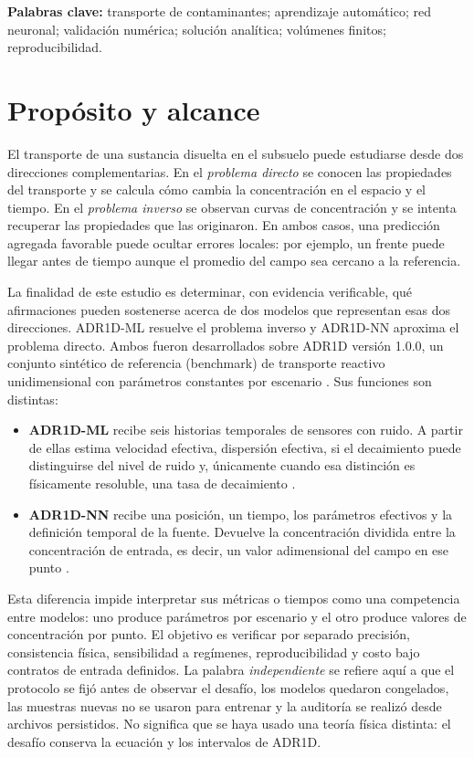 \documentclass[11pt,a4paper]{article}
\begin{document}
\textbf{Palabras clave:} transporte de contaminantes; aprendizaje automático;
red neuronal; validación numérica; solución analítica; volúmenes finitos;
reproducibilidad.

\newpage
\tableofcontents
\clearpage

\section{Propósito y alcance}

El transporte de una sustancia disuelta en el subsuelo puede estudiarse desde
dos direcciones complementarias. En el \emph{problema directo} se conocen las
propiedades del transporte y se calcula cómo cambia la concentración en el
espacio y el tiempo. En el \emph{problema inverso} se observan curvas de
concentración y se intenta recuperar las propiedades que las originaron. En
ambos casos, una predicción agregada favorable puede ocultar errores locales:
por ejemplo, un frente puede llegar antes de tiempo aunque el promedio del
campo sea cercano a la referencia.

La finalidad de este estudio es determinar, con evidencia verificable, qué
afirmaciones pueden sostenerse acerca de dos modelos que representan esas dos
direcciones. ADR1D-ML resuelve el problema inverso y ADR1D-NN aproxima el
problema directo. Ambos fueron desarrollados sobre ADR1D versión 1.0.0, un
conjunto sintético de referencia (benchmark) de transporte reactivo
unidimensional con parámetros
constantes por escenario \cite{adr1d}. Sus funciones son distintas:

\begin{itemize}
    \item \textbf{ADR1D-ML} recibe seis historias temporales de sensores con
    ruido. A partir de ellas estima velocidad efectiva, dispersión efectiva,
    si el decaimiento puede distinguirse del nivel de ruido y, únicamente
    cuando esa distinción es físicamente resoluble, una tasa de decaimiento
    \cite{adr1dml}.
    \item \textbf{ADR1D-NN} recibe una posición, un tiempo, los parámetros
    efectivos y la definición temporal de la fuente. Devuelve la concentración
    dividida entre la concentración de entrada, es decir, un valor adimensional
    del campo en ese punto \cite{adr1dnn}.
\end{itemize}

Esta diferencia impide interpretar sus métricas o tiempos como una competencia
entre modelos: uno produce parámetros por escenario y el otro produce valores
de concentración por punto. El objetivo es verificar por separado precisión,
consistencia física, sensibilidad a regímenes, reproducibilidad y costo bajo
contratos de entrada definidos. La palabra \emph{independiente} se refiere aquí
a que el protocolo se fijó antes de observar el desafío, los modelos quedaron
congelados, las muestras nuevas no se usaron para entrenar y la auditoría se
realizó desde archivos persistidos. No significa que se haya usado una teoría
física distinta: el desafío conserva la ecuación y los intervalos de ADR1D.
\end{document}
